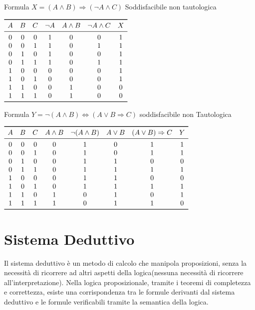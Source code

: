 Formula $X = (A \land B) \Rightarrow (\neg A \land C)$ \quad Soddisfacibile  non tautologica\newline

$\begin{array}{ccccccc}
\toprule A & B & C & \neg A & A \land B & \neg A \land C & X\\
\midrule
         0 & 0 & 0 & 1 & 0 & 0 & 1 \\
         0 & 0 & 1 & 1 & 0 & 1 & 1 \\
         0 & 1 & 0 & 1 & 0 & 0 & 1 \\
         0 & 1 & 1 & 1 & 0 & 1 & 1 \\
         1 & 0 & 0 & 0 & 0 & 0 & 1 \\
         1 & 0 & 1 & 0 & 0 & 0 & 1 \\
         1 & 1 & 0 & 0 & 1 & 0 & 0 \\
         1 & 1 & 1 & 0 & 1 & 0 & 0 \\
\bottomrule
\end{array}$ \newline

Formula $Y = \neg(A \land B) \iff (A \lor B \Rightarrow C)$ soddisfacibile non Tautologica

$\begin{array}{cccccccc}
\toprule
A & B & C & A \land B & \neg(A \land B) & A \lor B & (A \lor B) \Rightarrow C & Y \\
\midrule
0 & 0 & 0 & 0 & 1 & 0 & 1 & 1 \\
0 & 0 & 1 & 0 & 1 & 0 & 1 & 1 \\
0 & 1 & 0 & 0 & 1 & 1 & 0 & 0 \\
0 & 1 & 1 & 0 & 1 & 1 & 1 & 1 \\
1 & 0 & 0 & 0 & 1 & 1 & 0 & 0 \\
1 & 0 & 1 & 0 & 1 & 1 & 1 & 1 \\
1 & 1 & 0 & 1 & 0 & 1 & 0 & 1 \\
1 & 1 & 1 & 1 & 0 & 1 & 1 & 0 \\
\bottomrule
\end{array}$

\section{Sistema Deduttivo}
Il sistema deduttivo è un metodo di calcolo che manipola proposizioni, senza la
necessità di ricorrere ad altri aspetti della logica(nessuna necessità di ricorrere all'interpretazione).\newline
Nella logica proposizionale, tramite i teoremi di completezza e correttezza, esiste
una corrispondenza tra le formule derivanti dal sistema deduttivo e le formule verificabili
tramite la semantica della logica.

